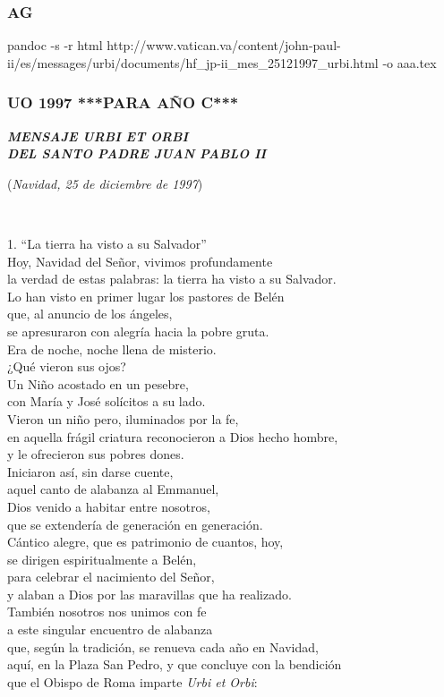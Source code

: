 \subsubsection{AG }
pandoc -s -r html http://www.vatican.va/content/john-paul-ii/es/messages/urbi/documents/hf_jp-ii_mes_25121997_urbi.html -o aaa.tex

\subsubsection{UO 1997 ***PARA AÑO C*** }
\emph{\textbf{MENSAJE URBI ET ORBI\\
		DEL SANTO PADRE JUAN PABLO II}}

(\emph{Navidad, 25 de diciembre de 1997})

~

1. ``La tierra ha visto a su Salvador''\\
Hoy, Navidad del Señor, vivimos profundamente\\
la verdad de estas palabras: la tierra ha visto a su Salvador.\\
Lo han visto en primer lugar los pastores de Belén\\
que, al anuncio de los ángeles,\\
se apresuraron con alegría hacia la pobre gruta.\\
Era de noche, noche llena de misterio.\\
¿Qué vieron sus ojos?\\
Un Niño acostado en un pesebre,\\
con María y José solícitos a su lado.\\
Vieron un niño pero, iluminados por la fe,\\
en aquella frágil criatura reconocieron a Dios hecho hombre,\\
y le ofrecieron sus pobres dones.\\
Iniciaron así, sin darse cuente,\\
aquel canto de alabanza al Emmanuel,\\
Dios venido a habitar entre nosotros,\\
que se extendería de generación en generación.\\
Cántico alegre, que es patrimonio de cuantos, hoy,\\
se dirigen espiritualmente a Belén,\\
para celebrar el nacimiento del Señor,\\
y alaban a Dios por las maravillas que ha realizado.\\
También nosotros nos unimos con fe\\
a este singular encuentro de alabanza\\
que, según la tradición, se renueva cada año en Navidad,\\
aquí, en la Plaza San Pedro, y que concluye con la bendición\\
que el Obispo de Roma imparte \emph{Urbi et Orbi}:

